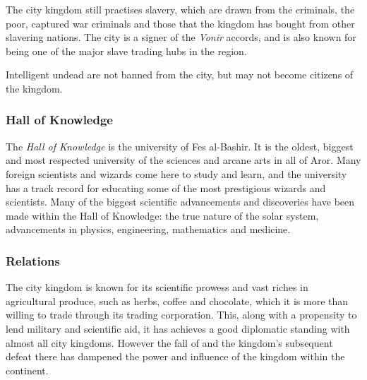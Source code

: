 The city kingdom still practises slavery, which are drawn from the criminals,
the poor, captured war criminals and those that the kingdom has bought from
other slavering nations. The city is a signer of the \emph{Vonir} accords, and
is also known for being one of the major slave trading hubs in the region.

Intelligent undead are not banned from the city, but may not become citizens
of the kingdom.

\subsubsection{Hall of Knowledge}
\label{sec:Hall of Knowledge}

The \emph{Hall of Knowledge} is the university of Fes al-Bashir. It is the
oldest, biggest and most respected university of the sciences and arcane arts
in all of Aror. Many foreign scientists and wizards come here to study and
learn, and the university has a track record for educating some of the most
prestigious wizards and scientists. Many of the biggest scientific
advancements and discoveries have been made within the Hall of Knowledge: the
true nature of the solar system, advancements in physics, engineering,
mathematics and medicine.

\subsubsection{Relations}

The city kingdom is known for its scientific prowess and vast riches in
agricultural produce, such as herbs, coffee and chocolate, which it is more
than willing to trade through its trading corporation. This, along with a
propensity to lend military and scientific aid, it has achieves a good
diplomatic standing with almost all city kingdoms. However the fall of
 and the kingdom's subsequent defeat there has dampened
the power and influence of the kingdom within the continent.

